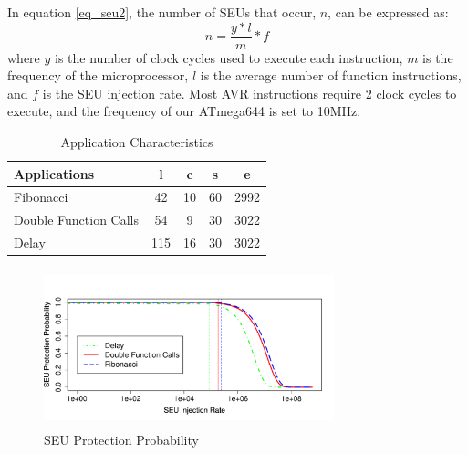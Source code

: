 In equation \ref{eq_seu2}, the number of SEUs that occur, $n$, can be expressed as:
\begin{equation}
n = \frac{y*l}{m}*f
\end{equation}
where $y$ is the number of clock cycles used to execute each instruction, $m$ is the frequency of the microprocessor, $l$ is the average number of function instructions, and $f$ is the SEU injection rate. Most AVR instructions require 2 clock cycles to execute, and the frequency of our ATmega644 is set to 10MHz.

\begin{table}
	\center
    \begin{tabular}{|l|c|c|c|c|}
    \hline
    \textbf{Applications}   & \textbf{l} & \textbf{c} & \textbf{s} & \textbf{e}	\\ \hline
    Fibonacci             		& 42			& 10		& 60	   	& 2992		\\
\hline
    Double Function Calls       & 54			& 9			& 30        & 3022		\\ \hline
    Delay         				& 115			& 16		& 30		& 3022		\\
 \hline
    \end{tabular}
    \vspace{5pt}
    \caption {Application Characteristics}
    \label{tbl_application_parameters}
\end{table}
\vspace{-35pt}
\begin{figure}
\centering
\includegraphics[width=0.75\textwidth, height=130pt]{figures/success_probability_v2.pdf}
\vspace{-5pt}
\caption{SEU Protection Probability}
\label{fig:success_probability}
\end{figure}
\vspace{-15pt}
